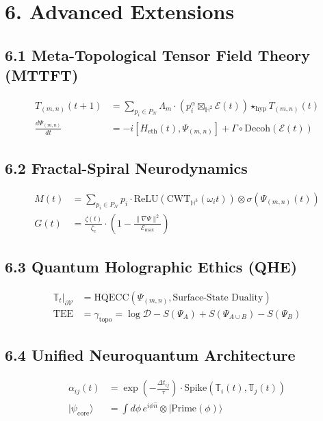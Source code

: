\documentclass{article}
\begin{document}
\section*{6. Advanced Extensions}

\subsection*{6.1 Meta-Topological Tensor Field Theory (MTTFT)}
\begin{align}
T_{(m,n)}(t+1) &= \sum_{p_i \in P_N} \Lambda_m \cdot \left( p_i^\alpha \boxtimes_{\mathbb{H}^2} \mathcal{E}(t) \right) \star_{\text{hyp}} T_{(m,n)}(t) \\
\frac{d\Psi_{(m,n)}}{dt} &= -i[H_{\text{eth}}(t), \Psi_{(m,n)}] + \Gamma \circ \text{Decoh}(\mathcal{E}(t))
\end{align}

\subsection*{6.2 Fractal-Spiral Neurodynamics}
\begin{align}
M(t) &= \sum_{p_i \in P_N} p_i \cdot \text{ReLU}\left( \text{CWT}_{\mathbb{H}^3}(\omega_i t) \right) \otimes \sigma(\Psi_{(m,n)}(t)) \\
G(t) &= \frac{\zeta(t)}{\zeta_c} \cdot \left( 1 - \frac{\| \nabla \Psi \|^2}{\mathcal{E}_{\text{max}}} \right)
\end{align}

\subsection*{6.3 Quantum Holographic Ethics (QHE)}
\begin{align}
\mathbb{T}_t \big|_{\partial \mathcal{V}} &= \text{HQECC}(\Psi_{(m,n)}, \text{Surface-State Duality}) \\
\text{TEE} &= \gamma_{\text{topo}} = \log \mathcal{D} - S(\Psi_A) + S(\Psi_{A \cup B}) - S(\Psi_B)
\end{align}

\subsection*{6.4 Unified Neuroquantum Architecture}
\begin{align}
\alpha_{ij}(t) &= \exp\left( -\frac{\Delta t_{ij}}{\tau} \right) \cdot \text{Spike}(\mathbb{T}_i(t), \mathbb{T}_j(t)) \\
|\psi_{\text{core}}\rangle &= \int d\phi \, e^{i\phi \hat{n}} \otimes |\text{Prime}(\phi)\rangle
\end{align}
\end{document}
